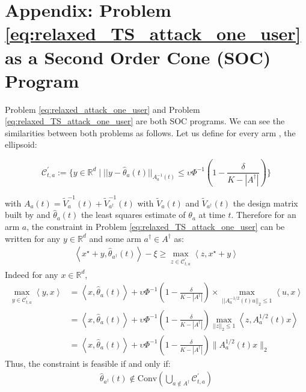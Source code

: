 \section{Appendix: Problem \eqref{eq:relaxed_TS_attack_one_user} as a Second Order Cone (SOC) Program}\label{app:one_context_ts_linucb}
Problem \eqref{eq:relaxed_attack_one_user} and Problem \eqref{eq:relaxed_TS_attack_one_user} are both SOC programs. We can see the similarities between both problems as follows. Let us define for every arm , the ellipsoid:

$$\mathcal{C}_{t,a}^{'} := \Big\{ y \in \mathbb{R}^{d} \mid || y - \hat{\theta}_{a}(t)||_{A_{a}^{-1}(t)} \leq \upsilon\Phi^{-1}\left( 1 - \frac{\delta}{K-|A^{\dagger}|}\right)\Big\}$$

with $A_{a}(t) = \tilde{V}_{a}^{-1}(t) + \tilde{V}_{a^{\dagger}}^{-1}(t)$ with $\tilde{V}_{a}(t)$ and $\tilde{V}_{a^{\dagger}}(t)$ the design matrix built by \lints and $\hat{\theta}_{a}(t)$ the least squares estimate of $\theta_a$ at time $t$. Therefore for an arm $a$, the constraint in Problem \eqref{eq:relaxed_TS_attack_one_user} can be written for any $y\in\mathbb{R}^{d}$ and some arm $a^{\dagger}\in A^{\dagger}$ as:
\begin{align*}
    \left\langle x^{\star}+y, \hat{\theta}_{a^{\dagger}}(t)\right\rangle - \xi \geq \max_{z\in \mathcal{C}_{t,a}^{'}} \left\langle z, x^{\star} + y\right\rangle
\end{align*}
Indeed for any $x\in \mathbb{R}^{d}$,
\begin{align*}
    \max_{y\in \mathcal{C}_{t,a}^{'}} \left\langle y,x\right\rangle &= \left\langle x, \hat{\theta}_{a}(t)\right\rangle + \upsilon\Phi^{-1}\left( 1 - \frac{\delta}{K-|A^{\dagger}|}\right)\times\max_{ ||A_{a}^{-1/2}(t)u||_{2}\leq 1} \left\langle u, x\right\rangle\\
    &= \left\langle x, \hat{\theta}_{a}(t)\right\rangle + \upsilon\Phi^{-1}\left( 1 - \frac{\delta}{K-|A^{\dagger}|}\right)\max_{ ||z||_{2}\leq 1} \left\langle z, A_{a}^{1/2}(t)x\right\rangle \\
    &= \left\langle x, \hat{\theta}_{a}(t)\right\rangle + \upsilon\Phi^{-1}\left( 1 - \frac{\delta}{K-|A^{\dagger}|}\right)\lVert A_{a}^{1/2}(t)x\rVert_{2}
\end{align*}
Thus, the constraint is feasible if and only if:
\begin{align*}
    \hat{\theta}_{a^{\dagger}}(t) \not\in \text{Conv}\left( \bigcup_{a\not\in A^{\dagger}}  \mathcal{C}_{t,a}^{'}\right)
\end{align*}
